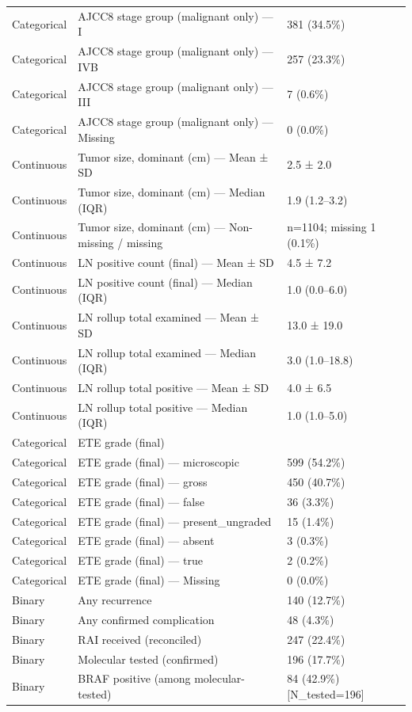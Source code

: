 \begin{table}[htbp]
\begin{tabular}{lll}
Categorical & AJCC8 stage group (malignant only) — I & 381 (34.5\%) \\
Categorical & AJCC8 stage group (malignant only) — IVB & 257 (23.3\%) \\
Categorical & AJCC8 stage group (malignant only) — III & 7 (0.6\%) \\
Categorical & AJCC8 stage group (malignant only) — Missing & 0 (0.0\%) \\
Continuous & Tumor size, dominant (cm) — Mean ± SD & 2.5 ± 2.0 \\
Continuous & Tumor size, dominant (cm) — Median (IQR) & 1.9 (1.2–3.2) \\
Continuous & Tumor size, dominant (cm) — Non-missing / missing & n=1104; missing 1 (0.1\%) \\
Continuous & LN positive count (final) — Mean ± SD & 4.5 ± 7.2 \\
Continuous & LN positive count (final) — Median (IQR) & 1.0 (0.0–6.0) \\
Continuous & LN rollup total examined — Mean ± SD & 13.0 ± 19.0 \\
Continuous & LN rollup total examined — Median (IQR) & 3.0 (1.0–18.8) \\
Continuous & LN rollup total positive — Mean ± SD & 4.0 ± 6.5 \\
Continuous & LN rollup total positive — Median (IQR) & 1.0 (1.0–5.0) \\
Categorical & ETE grade (final) &  \\
Categorical & ETE grade (final) — microscopic & 599 (54.2\%) \\
Categorical & ETE grade (final) — gross & 450 (40.7\%) \\
Categorical & ETE grade (final) — false & 36 (3.3\%) \\
Categorical & ETE grade (final) — present\_ungraded & 15 (1.4\%) \\
Categorical & ETE grade (final) — absent & 3 (0.3\%) \\
Categorical & ETE grade (final) — true & 2 (0.2\%) \\
Categorical & ETE grade (final) — Missing & 0 (0.0\%) \\
Binary & Any recurrence & 140 (12.7\%) \\
Binary & Any confirmed complication & 48 (4.3\%) \\
Binary & RAI received (reconciled) & 247 (22.4\%) \\
Binary & Molecular tested (confirmed) & 196 (17.7\%) \\
Binary & BRAF positive (among molecular-tested) & 84 (42.9\%) [N\_tested=196] \\

\end{tabular}
\end{table}
